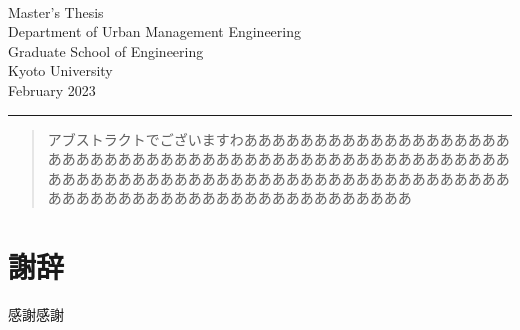 \documentclass[11truept,a4paper,onecolumn,dvipdfmx]{jsreport}
\begin{document}


\begin{titlepage}
    \vspace{15mm}
    \begin{wrapfigure}{r}{0.45\linewidth}
        \centering
        \hspace{25mm}
        
    \end{wrapfigure}
    \leavevmode
    \par
    {
    \fontsize{12truept}{12truept}\selectfont
    \\
    Master's Thesis\\
    Department of Urban Management Engineering\\
    Graduate School of Engineering\\
    Kyoto University\\
    February 2023\\
    }
    \hrule
    \vspace{25mm}
    {
    \fontsize{16truept}{36truept}\selectfont
    }
\end{titlepage}


\begin{abstract}
    アブストラクトでございますわあああああああああああああああああああああああああああああああああああああああああああああああああああああああああああああああああああああああああああああああああああああああああああああああああああああああああああああああ
\end{abstract}


\tableofcontents    %
\clearpage

\setcounter{page}{1}





\appendix     %


\clearpage
\chapter*{謝辞}     %
感謝感謝




\end{document}

